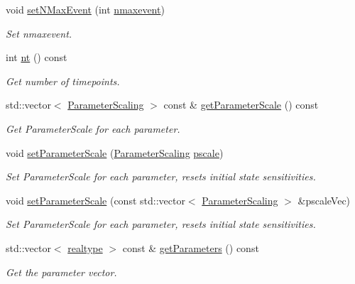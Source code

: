 \begin{DoxyCompactItemize}
void \mbox{\hyperlink{classamici_1_1_model_a35f06fdd341805405b851788ffe981c4}{set\+N\+Max\+Event}} (int \mbox{\hyperlink{classamici_1_1_model_aff0f3f25d886279a90dbf0571956885c}{nmaxevent}})
\begin{DoxyCompactList}\small\item\em Set nmaxevent. \end{DoxyCompactList}\item 
int \mbox{\hyperlink{classamici_1_1_model_a4c23d300cbe15b0afb1ee3731d47cc93}{nt}} () const
\begin{DoxyCompactList}\small\item\em Get number of timepoints. \end{DoxyCompactList}\item 
std\+::vector$<$ \mbox{\hyperlink{namespaceamici_a42f062082226e9284c201d9eab71a3a0}{Parameter\+Scaling}} $>$ const  \& \mbox{\hyperlink{classamici_1_1_model_ab14620b22a79748a09a88b9311a7f6d5}{get\+Parameter\+Scale}} () const
\begin{DoxyCompactList}\small\item\em Get Parameter\+Scale for each parameter. \end{DoxyCompactList}\item 
void \mbox{\hyperlink{classamici_1_1_model_a7e25febbfd9db80f64a4f73a2718bda7}{set\+Parameter\+Scale}} (\mbox{\hyperlink{namespaceamici_a42f062082226e9284c201d9eab71a3a0}{Parameter\+Scaling}} \mbox{\hyperlink{classamici_1_1_model_a5d1c7237dc998202fe1b3393b50f77ce}{pscale}})
\begin{DoxyCompactList}\small\item\em Set Parameter\+Scale for each parameter, resets initial state sensitivities. \end{DoxyCompactList}\item 
void \mbox{\hyperlink{classamici_1_1_model_a5bff74aa6d87148a2cf0943ca1dbd49d}{set\+Parameter\+Scale}} (const std\+::vector$<$ \mbox{\hyperlink{namespaceamici_a42f062082226e9284c201d9eab71a3a0}{Parameter\+Scaling}} $>$ \&pscale\+Vec)
\begin{DoxyCompactList}\small\item\em Set Parameter\+Scale for each parameter, resets initial state sensitivities. \end{DoxyCompactList}\item 
std\+::vector$<$ \mbox{\hyperlink{namespaceamici_a1bdce28051d6a53868f7ccbf5f2c14a3}{realtype}} $>$ const  \& \mbox{\hyperlink{classamici_1_1_model_a1bb7ee08df1e2e42da7dceb2100b6131}{get\+Parameters}} () const
\begin{DoxyCompactList}\small\item\em Get the parameter vector. \end{DoxyCompactList}\item 

\end{DoxyCompactItemize}
